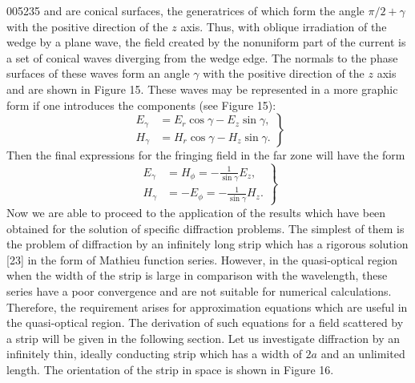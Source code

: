 \begin{scanpage}{0052}{35}
and are conical surfaces, the generatrices of which form the angle $\pi/2+\gamma$ with the positive direction of the $z$ axis. Thus, with oblique irradiation of the wedge by a plane wave, the field created by the nonuniform part of the current is a set of conical waves diverging from the wedge edge. The normals to the phase surfaces of these waves form an angle $\gamma$ with the positive direction of the $z$ axis and are shown in Figure 15. These waves may be represented in a more graphic form if one introduces the components (see Figure 15):
\[\left.\begin{aligned}E_{\gamma}&=E_r\cos\gamma-E_z\sin\gamma,\\H_{\gamma}&=H_r\cos\gamma-H_z\sin\gamma.\end{aligned}\right\}\tag{5.15}\]
Then the final expressions for the fringing field in the far zone will have the form
\[\left.\begin{aligned}E_{\gamma}&=H_\phi=-\frac1{\sin\gamma}E_z,\\H_{\gamma}&=-E_\phi=-\frac1{\sin\gamma}H_z.\end{aligned}\right\}\tag{5.16}\]
Now we are able to proceed to the application of the results which have been obtained for the solution of specific diffraction problems. The simplest of them is the problem of diffraction by an infinitely long strip which has a rigorous solution [23] in the form of Mathieu function series. However, in the quasi-optical region when the width of the strip is large in comparison with the wavelength, these series have a poor convergence and are not suitable for numerical calculations. Therefore, the requirement arises for approximation equations which are useful in the quasi-optical region. The derivation of such equations for a field scattered by a strip will be given in the following section.
Let us investigate diffraction by an infinitely thin, ideally conducting strip which has a width of $2a$ and an unlimited length. The orientation of the strip in space is shown in Figure 16.
\end{scanpage}
